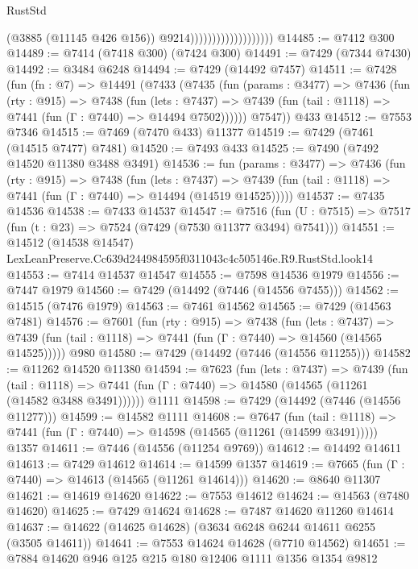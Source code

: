 \begin{lexlean}{RustStd}
\begin{coremodule}
                                          (@3885 (@11145 @426 @156))
                                          @9214)))))))))))))))))))
@14485 := @7412 @300
@14489 := @7414 (@7418 @300) (@7424 @300)
@14491 := @7429 (@7344 @7430)
@14492 := @3484 @6248
@14494 := @7429 (@14492 @7457)
@14511 := @7428
    (fun (fn : @7) =>
    @14491
      (@7433
        (@7435
          (fun (params : @3477) =>
          @7436
            (fun (rty : @915) =>
            @7438
              (fun (lets : @7437) =>
              @7439 (fun (tail : @1118) => @7441 (fun (Γ : @7440) => @14494 @7502))))))
        @7547))
    @433
@14512 := @7553 @7346
@14515 := @7469 (@7470 @433) @11377
@14519 := @7429 (@7461 (@14515 @7477) @7481)
@14520 := @7493 @433
@14525 := @7490 (@7492 @14520 @11380 @3488 @3491)
@14536 := fun (params : @3477) =>
  @7436
    (fun (rty : @915) =>
    @7438
      (fun (lets : @7437) =>
      @7439 (fun (tail : @1118) => @7441 (fun (Γ : @7440) => @14494 (@14519 @14525)))))
@14537 := @7435 @14536
@14538 := @7433 @14537
@14547 := @7516
    (fun (U : @7515) => @7517 (fun (t : @23) => @7524 (@7429 (@7530 @11377 @3494) @7541)))
@14551 := @14512 (@14538 @14547) LexLeanPreserve.Cc639d244984595f0311043c4c505146e.R9.RustStd.look14
@14553 := @7414 @14537 @14547
@14555 := @7598 @14536 @1979
@14556 := @7447 @1979
@14560 := @7429 (@14492 (@7446 (@14556 @7455)))
@14562 := @14515 (@7476 @1979)
@14563 := @7461 @14562
@14565 := @7429 (@14563 @7481)
@14576 := @7601
    (fun (rty : @915) =>
    @7438
      (fun (lets : @7437) =>
      @7439 (fun (tail : @1118) => @7441 (fun (Γ : @7440) => @14560 (@14565 @14525)))))
    @980
@14580 := @7429 (@14492 (@7446 (@14556 @11255)))
@14582 := @11262 @14520 @11380
@14594 := @7623
    (fun (lets : @7437) =>
    @7439
      (fun (tail : @1118) =>
      @7441 (fun (Γ : @7440) => @14580 (@14565 (@11261 (@14582 @3488 @3491))))))
    @1111
@14598 := @7429 (@14492 (@7446 (@14556 @11277)))
@14599 := @14582 @1111
@14608 := @7647
    (fun (tail : @1118) => @7441 (fun (Γ : @7440) => @14598 (@14565 (@11261 (@14599 @3491)))))
    @1357
@14611 := @7446 (@14556 (@11254 @9769))
@14612 := @14492 @14611
@14613 := @7429 @14612
@14614 := @14599 @1357
@14619 := @7665 (fun (Γ : @7440) => @14613 (@14565 (@11261 @14614)))
@14620 := @8640 @11307
@14621 := @14619 @14620
@14622 := @7553 @14612
@14624 := @14563 (@7480 @14620)
@14625 := @7429 @14624
@14628 := @7487 @14620 @11260 @14614
@14637 := @14622 (@14625 @14628) (@3634 @6248 @6244 @14611 @6255 (@3505 @14611))
@14641 := @7553 @14624 @14628 (@7710 @14562)
@14651 := @7884 @14620 @946 @125 @215 @180 @12406 @1111 @1356 @1354 @9812

\end{coremodule}
\end{lexlean}
